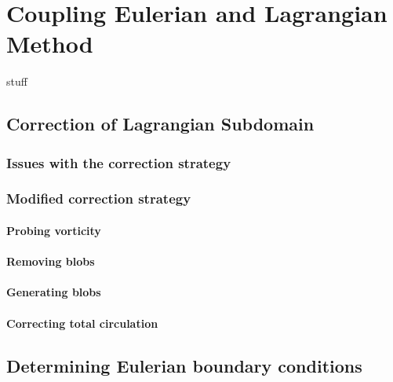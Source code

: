 \chapter{Coupling Eulerian and Lagrangian Method}
\label{ch:coupling}

stuff

\section{Correction of Lagrangian Subdomain}

	\subsection{Issues with the correction strategy}			

	\subsection{Modified correction strategy}			

	\subsubsection*{Probing vorticity}
	\subsubsection*{Removing blobs}
	\subsubsection*{Generating blobs}
	\subsubsection*{Correcting total circulation}


\section{Determining Eulerian boundary conditions}


